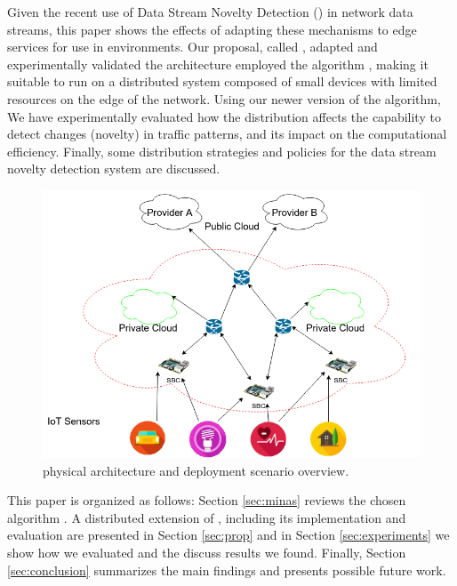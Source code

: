 Given the recent use of Data Stream Novelty Detection (\nd) in network data
streams, this paper shows the effects of adapting these mechanisms to edge
services for use in \iot environments.
Our proposal, called \mfog, adapted and experimentally validated the \arch
architecture \cite{Cassales2019a} employed the \nd algorithm \minas
\cite{Faria2013Minas,Faria2015minas}, making it suitable to run
on a distributed system composed of small devices with limited
resources on the edge of the network.
Using our newer version of the \minas algorithm, We have experimentally evaluated 
how the distribution 
affects the capability to detect changes (novelty) in
traffic patterns, and its impact on the computational efficiency.
Finally, some distribution strategies and policies for the data stream
novelty detection system are discussed.

\begin{figure}[h!]
    \centering
    \includegraphics[width=0.5\linewidth]{figures/cassalesimgs-000.png}
    \caption{\arch \cite{Cassales2019a} physical architecture and deployment scenario overview.}
    \label{fig:mfog-phy-arch-cloud}
\end{figure}

This paper is organized as follows:
Section \ref{sec:minas} reviews the chosen \nd algorithm \minas.
A distributed extension of \minas, including its
implementation and evaluation are presented in Section \ref{sec:prop}
and in Section \ref{sec:experiments} we show how we evaluated \mfog and
the discuss results we found.
Finally, Section \ref{sec:conclusion} summarizes the main findings and presents
possible future work.

